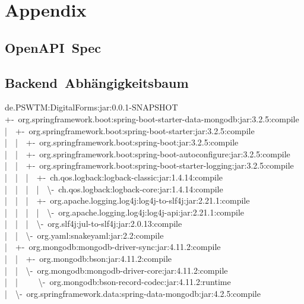\chapter{Appendix}\label{ch:appendix}

\section{OpenAPI~Spec}\label{sec:openapi-spec}


\section{Backend~Abhängigkeitsbaum}\label{sec:backend-abhangigkeitsbaum}
de.PSWTM:DigitalForms:jar:0.0.1-SNAPSHOT\\
+-~org.springframework.boot:spring-boot-starter-data-mongodb:jar:3.2.5:compile\\
|~~+-~org.springframework.boot:spring-boot-starter:jar:3.2.5:compile\\
|~~|~~+-~org.springframework.boot:spring-boot:jar:3.2.5:compile\\
|~~|~~+-~org.springframework.boot:spring-boot-autoconfigure:jar:3.2.5:compile\\
|~~|~~+-~org.springframework.boot:spring-boot-starter-logging:jar:3.2.5:compile\\
|~~|~~|~~+-~ch.qos.logback:logback-classic:jar:1.4.14:compile\\
|~~|~~|~~|~~\textbackslash-~ch.qos.logback:logback-core:jar:1.4.14:compile\\
|~~|~~|~~+-~org.apache.logging.log4j:log4j-to-slf4j:jar:2.21.1:compile\\
|~~|~~|~~|~~\textbackslash-~org.apache.logging.log4j:log4j-api:jar:2.21.1:compile\\
|~~|~~|~~\textbackslash-~org.slf4j:jul-to-slf4j:jar:2.0.13:compile\\
|~~|~~\textbackslash-~org.yaml:snakeyaml:jar:2.2:compile\\
|~~+-~org.mongodb:mongodb-driver-sync:jar:4.11.2:compile\\
|~~|~~+-~org.mongodb:bson:jar:4.11.2:compile\\
|~~|~~\textbackslash-~org.mongodb:mongodb-driver-core:jar:4.11.2:compile\\
|~~|~~~~~\textbackslash-~org.mongodb:bson-record-codec:jar:4.11.2:runtime\\
|~~\textbackslash-~org.springframework.data:spring-data-mongodb:jar:4.2.5:compile\\
